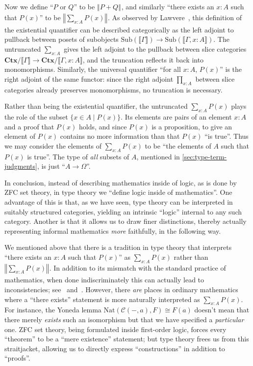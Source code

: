 \documentclass[10pt]{article}
\def\m#1{\llbracket#1\rrbracket}
\def\C{\mathscr{C}}
\def\Ctx{\mathbf{Ctx}}
\numberwithin{equation}{section}
\newcommand{\trunc}[2]{\mathopen{}\left\Vert #2\right\Vert_{#1}\mathclose{}}
\newcommand{\brck}[1]{\trunc{}{#1}}
\begin{document}
Now we define ``$P$ or $Q$'' to be $\brck{P+Q}$, and similarly ``there exists an $x:A$ such that $P(x)$'' to be $\brck{\sum_{x:A} P(x)}$.
As observed by Lawvere~\cite{lawvere:adjointness}, this definition of the existential quantifier can be described categorically as the left adjoint to pullback between posets of subobjects $\mathrm{Sub}(\m\Gamma) \to \mathrm{Sub}(\m{\Gamma,x:A})$.
The untruncated $\sum_{x:A}$ gives the left adjoint to the pullback between slice categories $\Ctx/\m\Gamma  \to \Ctx/\m{\Gamma,x:A}$, and the truncation reflects it back into monomorphisms.
Similarly, the universal quantifier ``for all $x:A$, $P(x)$'' is the right adjoint of the same functor: since the right adjoint $\prod_{x:A}$ between slice categories already preserves monomorphisms, no truncation is necessary.

Rather than being the existential quantifier, the untruncated $\sum_{x:A} P(x)$ plays the role of the subset $\{ x\in A \mid P(x) \}$.
Its elements are pairs of an element $x:A$ and a proof that $P(x)$ holds, and since $P(x)$ is a proposition, to give an element of $P(x)$ contains no more information than that $P(x)$ ``is true''.
Thus we may consider the elements of $\sum_{x:A} P(x)$ to be ``the elements of $A$ such that $P(x)$ is true''.
The type of \emph{all} subsets of $A$, mentioned in \cref{sec:type-term-judgments}, is just ``$A\to\Omega$''.

In conclusion, instead of describing mathematics inside of logic, as is done by ZFC set theory, in type theory we ``define logic inside of mathematics''.
One advantage of this is that, as we have seen, type theory can be interpreted in suitably structured categories, yielding an intrinsic ``logic'' internal to any such category.
Another is that it allows us to draw finer distinctions, thereby actually representing informal mathematics \emph{more} faithfully, in the following way.

We mentioned above that there is a tradition in type theory that interprets ``there exists an $x:A$ such that $P(x)$'' as $\sum_{x:A} P(x)$ rather than $\brck{\sum_{x:A} P(x)}$.
In addition to its mismatch with the standard practice of mathematics, when done indiscriminately this can actually lead to inconsistencies; see~\cite[\S3.2]{hottbook} and~\cite{escardo-xu:brouwer-ch}.
However, there \emph{are} places in ordinary mathematics where a ``there exists'' statement is more naturally interpreted as $\sum_{x:A} P(x)$.
For instance, the Yoneda lemma $\mathrm{Nat}(\C(-,a),F) \cong F(a)$ doesn't mean that there merely \emph{exists} such an isomorphism but that we have specified a \emph{particular} one.
ZFC set theory, being formulated inside first-order logic, forces every ``theorem'' to be a ``mere existence'' statement; but type theory frees us from this straitjacket, allowing us to directly express ``constructions'' in addition to ``proofs''.
\end{document}
